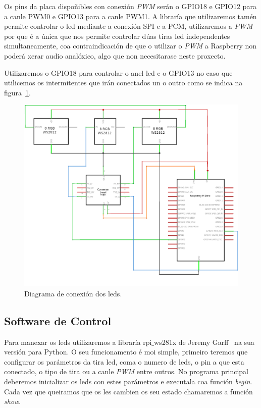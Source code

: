 Os pins da placa dispoñibles con conexión \emph{PWM} serán o GPIO18 e GPIO12 para a canle PWM0 e GPIO13 para a canle PWM1. A libraría que utilizaremos tamén permite controlar o led mediante a conexión SPI e a PCM, utilizaremos a \emph{PWM} por que é a única que nos permite controlar dúas tiras led independentes simultaneamente, coa contraindicación de que o utilizar o \emph{PWM} a Raspberry non poderá xerar audio analóxico, algo que non necesitarase neste proxecto.

Utilizaremos o GPIO18 para controlar o anel led e o GPIO13 no caso que utilicemos os intermitentes que irán conectados un o outro como se indica na figura~\ref{fig:conexions_leds}.

\begin{figure}[tb]
  \centering
  \includegraphics[scale=1]{imaxes/circuito-leds.png}
  \caption{Diagrama de conexión dos leds.}
  \label{fig:conexions_leds}
\end{figure}

\subsection{Software de Control}
Para manexar os leds utilizaremos a libraría rpi\(\_\)ws281x de Jeremy Garff~\cite{garffUserspaceRaspberryPi2019} na sua versión para Python. O seu funcionamento é moi simple, primeiro teremos que configurar os parámetros da tira led, coma o numero de leds, o pin a que esta conectado, o tipo de tira  ou a canle \emph{PWM} entre outros. No programa principal deberemos inicializar os leds con estes parámetros e executala coa función \emph{begin}. Cada vez que queiramos que os les cambien os seu estado chamaremos a función \emph{show}.

